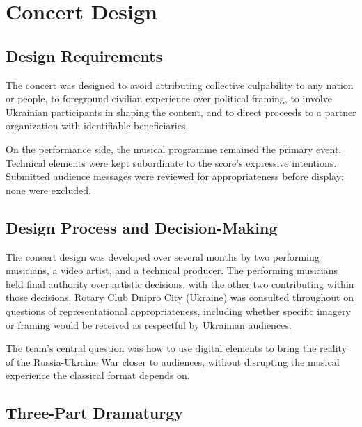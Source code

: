 \documentclass[sigconf,anonymous,review]{acmart}
\begin{document}
\section{Concert Design}

\subsection{Design Requirements}

The concert was designed to avoid attributing collective culpability to any nation or people,
to foreground civilian experience over political framing, to involve Ukrainian participants
in shaping the content, and to direct proceeds to a partner organization with identifiable
beneficiaries.

On the performance side, the musical programme remained the primary event.
Technical elements were kept subordinate to the score's expressive intentions.
Submitted audience messages were reviewed for appropriateness before display; none were excluded.

\subsection{Design Process and Decision-Making}

The concert design was developed over several months by two performing musicians, a video
artist, and a technical producer.
The performing musicians held final authority over artistic decisions, with the other two
contributing within those decisions.
Rotary Club Dnipro City (Ukraine) was consulted throughout on questions of representational
appropriateness, including whether specific imagery or framing would be received as
respectful by Ukrainian audiences.

The team's central question was how to use digital elements to bring the reality of the
Russia-Ukraine War closer to audiences, without disrupting the musical experience the
classical format depends on.

\subsection{Three-Part Dramaturgy}
\end{document}
